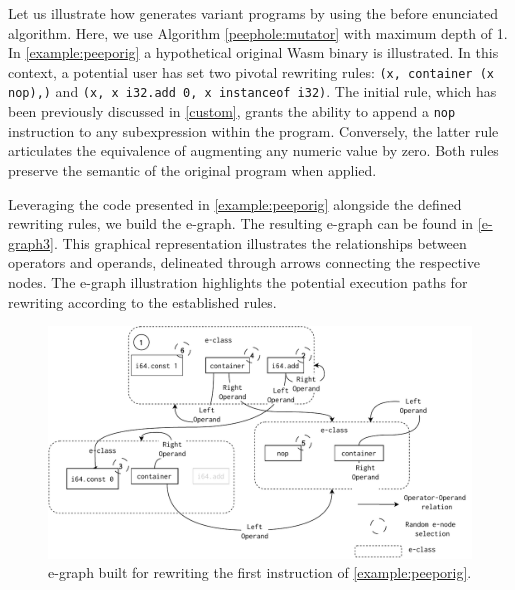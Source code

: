 

Let us illustrate how \tool generates variant programs by using the before enunciated algorithm.
Here, we use Algorithm \ref{peephole:mutator} with maximum depth of 1.
In \autoref{example:peeporig} a hypothetical original Wasm binary is illustrated.
In this context, a potential user has set two pivotal rewriting rules: \texttt{(x, container (x nop),)} and \texttt{(x, x i32.add 0, x instanceof i32)}.
The initial rule, which has been previously discussed in \autoref{custom}, grants the ability to append a \texttt{nop} instruction to any subexpression within the program. 
Conversely, the latter rule articulates the equivalence of augmenting any numeric value by zero.
Both rules preserve the semantic of the original program when applied.

Leveraging the code presented in \autoref{example:peeporig} alongside the defined rewriting rules, we build the e-graph.
The resulting e-graph can be found in \autoref{e-graph3}. 
This graphical representation illustrates the relationships between operators and operands, delineated through arrows connecting the respective nodes.
The e-graph illustration highlights the potential execution paths for rewriting according to the established rules.




\begin{figure}
    \centering
    \includegraphics[width=1.0\linewidth]{figures/e-graph-traversal2.pdf}
    \caption{e-graph built for rewriting the first instruction of \autoref{example:peeporig}. }
  \label{e-graph3}
\end{figure}



